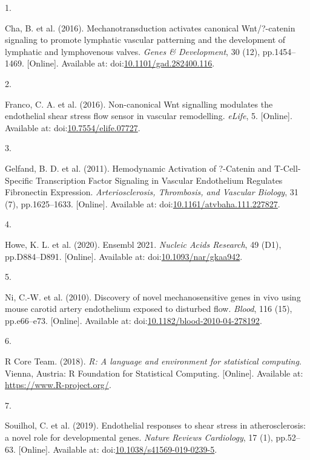\documentclass[
  12pt,
]{article}
\newlength{\cslhangindent}
\newlength{\csllabelwidth}
\newlength{\cslentryspacingunit} %
\newenvironment{CSLReferences}[2] %
 {%
  \setlength{\parindent}{0pt}
  \ifodd #1
  \let\oldpar\par
  \def\par{\hangindent=\cslhangindent\oldpar}
  \fi
  \setlength{\parskip}{#2\cslentryspacingunit}
 }%
 {}
\newcommand{\CSLLeftMargin}[1]{\parbox[t]{\csllabelwidth}{#1}}
\newcommand{\CSLRightInline}[1]{\parbox[t]{\linewidth - \csllabelwidth}{#1}\break}
\begin{document}
\hypertarget{refs}{}
\begin{CSLReferences}{0}{0}
\leavevmode{}%
\CSLLeftMargin{1. }
\CSLRightInline{Cha, B. {et al.} (2016). {Mechanotransduction activates canonical Wnt/?-catenin signaling to promote lymphatic vascular patterning and the development of lymphatic and lymphovenous valves}. \emph{Genes \& Development}, 30 (12), pp.1454--1469. {[}Online{]}. Available at: doi:\href{https://doi.org/10.1101/gad.282400.116}{10.1101/gad.282400.116}.}

\leavevmode{}%
\CSLLeftMargin{2. }
\CSLRightInline{Franco, C. A. {et al.} (2016). {Non-canonical Wnt signalling modulates the endothelial shear stress flow sensor in vascular remodelling}. \emph{eLife}, 5. {[}Online{]}. Available at: doi:\href{https://doi.org/10.7554/elife.07727}{10.7554/elife.07727}.}

\leavevmode{}%
\CSLLeftMargin{3. }
\CSLRightInline{Gelfand, B. D. {et al.} (2011). {Hemodynamic Activation of ?-Catenin and T-Cell-Specific Transcription Factor Signaling in Vascular Endothelium Regulates Fibronectin Expression}. \emph{Arteriosclerosis, Thrombosis, and Vascular Biology}, 31 (7), pp.1625--1633. {[}Online{]}. Available at: doi:\href{https://doi.org/10.1161/atvbaha.111.227827}{10.1161/atvbaha.111.227827}.}

\leavevmode{}%
\CSLLeftMargin{4. }
\CSLRightInline{Howe, K. L. {et al.} (2020). {Ensembl 2021}. \emph{Nucleic Acids Research}, 49 (D1), pp.D884--D891. {[}Online{]}. Available at: doi:\href{https://doi.org/10.1093/nar/gkaa942}{10.1093/nar/gkaa942}.}

\leavevmode{}%
\CSLLeftMargin{5. }
\CSLRightInline{Ni, C.-W. {et al.} (2010). {Discovery of novel mechanosensitive genes in vivo using mouse carotid artery endothelium exposed to disturbed flow}. \emph{Blood}, 116 (15), pp.e66--e73. {[}Online{]}. Available at: doi:\href{https://doi.org/10.1182/blood-2010-04-278192}{10.1182/blood-2010-04-278192}.}

\leavevmode{}%
\CSLLeftMargin{6. }
\CSLRightInline{R Core Team. (2018). {\emph{R: A language and environment for statistical computing}}. Vienna, Austria: R Foundation for Statistical Computing. {[}Online{]}. Available at: \url{https://www.R-project.org/}.}

\leavevmode{}%
\CSLLeftMargin{7. }
\CSLRightInline{Souilhol, C. {et al.} (2019). {Endothelial responses to shear stress in atherosclerosis: a novel role for developmental genes}. \emph{Nature Reviews Cardiology}, 17 (1), pp.52--63. {[}Online{]}. Available at: doi:\href{https://doi.org/10.1038/s41569-019-0239-5}{10.1038/s41569-019-0239-5}.}


\end{CSLReferences}
\end{document}
